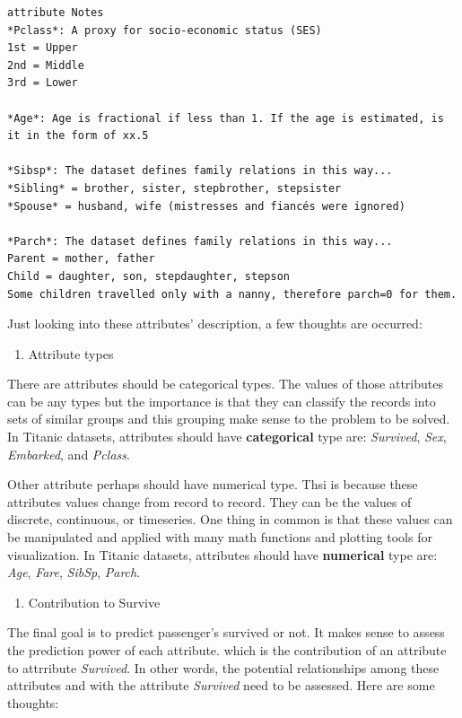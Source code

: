 \documentclass[
]{book}
\providecommand{\tightlist}{%
  \setlength{\itemsep}{0pt}\setlength{\parskip}{0pt}}
\begin{document}
\begin{verbatim}
attribute Notes
*Pclass*: A proxy for socio-economic status (SES)
1st = Upper
2nd = Middle
3rd = Lower

*Age*: Age is fractional if less than 1. If the age is estimated, is it in the form of xx.5

*Sibsp*: The dataset defines family relations in this way...
*Sibling* = brother, sister, stepbrother, stepsister
*Spouse* = husband, wife (mistresses and fiancés were ignored)

*Parch*: The dataset defines family relations in this way...
Parent = mother, father
Child = daughter, son, stepdaughter, stepson
Some children travelled only with a nanny, therefore parch=0 for them.
\end{verbatim}

Just looking into these attributes' description, a few thoughts are occurred:

\begin{enumerate}
\def\labelenumi{\arabic{enumi}.}
\tightlist
\item
  Attribute types
\end{enumerate}

There are attributes should be categorical types. The values of those attributes can be any types but the importance is that they can classify the records into sets of similar groups and this grouping make sense to the problem to be solved. In Titanic datasets, attributes should have \textbf{categorical} type are: \emph{Survived}, \emph{Sex}, \emph{Embarked}, and \emph{Pclass}.

Other attribute perhaps should have numerical type. Thsi is because these attributes values change from record to record. They can be the values of discrete, continuous, or timeseries. One thing in common is that these values can be manipulated and applied with many math functions and plotting tools for visualization. In Titanic datasets, attributes should have \textbf{numerical} type are: \emph{Age}, \emph{Fare}, \emph{SibSp}, \emph{Parch}.

\begin{enumerate}
\def\labelenumi{\arabic{enumi}.}
\setcounter{enumi}{1}
\tightlist
\item
  Contribution to Survive
\end{enumerate}

The final goal is to predict passenger's survived or not. It makes sense to assess the prediction power of each attribute. which is the contribution of an attribute to attrribute \emph{Survived}. In other words, the potential relationships among these attributes and with the attribute \emph{Survived} need to be assessed. Here are some thoughts:
\end{document}
